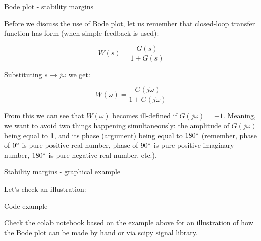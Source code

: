 \documentclass{beamer}
\begin{document}
\begin{frame}{Bode plot - stability margins}
\begin{flushleft}

Before we discuss the use of Bode plot, let us remember that closed-loop transfer function has form (when simple feedback is used):

\begin{equation}
    W(s) = \frac{G(s)}{1 + G(s)}
\end{equation}

Substituting $s \longrightarrow j \omega$ we get:

\begin{equation}
    W(\omega) = \frac{G(j \omega)}{1 + G(j \omega)}
\end{equation}

From this we can see that $W(\omega)$ becomes ill-defined if $G(j \omega) = -1$. Meaning, we want to avoid two things happening simultaneously: the amplitude of $G(j \omega)$ being equal to 1, and its phase (argument) being equal to $180\degree$ (remember, phase of $0\degree$ is pure positive real number, phase of $90\degree$ is pure positive imaginary number, $180\degree$ is pure negative real number, etc.).

\end{flushleft}
\end{frame}





\begin{frame}{Stability margins - graphical example}
\begin{flushleft}

Let's check an illustration:

\bigskip

\centerline{\textcolor{black}{}}


\end{flushleft}
\end{frame}




\begin{frame}{Code example}
\begin{flushleft}

Check the colab notebook based on the example above for an illustration of how the Bode plot can be made by hand or via scipy signal library.

\bigskip

\centerline{\textcolor{black}{}}


\end{flushleft}
\end{frame}
\end{document}
